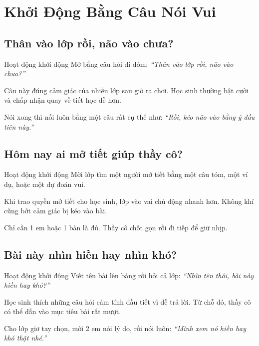\chapter{Khởi Động Bằng Câu Nói Vui}

\section{Thân vào lớp rồi, não vào chưa?}
\begin{khoidongbox}{Hoạt động khởi động}
Mở bằng câu hỏi dí dỏm: \textit{``Thân vào lớp rồi, não vào chưa?''}
\end{khoidongbox}
\begin{visaohieuqua}
Câu này đúng cảm giác của nhiều lớp sau giờ ra chơi. Học sinh thường bật cười và chấp nhận quay về tiết học dễ hơn.
\end{visaohieuqua}
\begin{cachlam5phut}
Nói xong thì nối luôn bằng một câu rất cụ thể như: \textit{``Rồi, kéo não vào bằng ý đầu tiên này.''}
\end{cachlam5phut}
\ngancach

\section{Hôm nay ai mở tiết giúp thầy cô?}
\begin{khoidongbox}{Hoạt động khởi động}
Mời lớp tìm một người mở tiết bằng một câu tóm, một ví dụ, hoặc một dự đoán vui.
\end{khoidongbox}
\begin{visaohieuqua}
Khi trao quyền mở tiết cho học sinh, lớp vào vai chủ động nhanh hơn. Không khí cũng bớt cảm giác bị kéo vào bài.
\end{visaohieuqua}
\begin{cachlam5phut}
Chỉ cần 1 em hoặc 1 bàn là đủ. Thầy cô chốt gọn rồi đi tiếp để giữ nhịp.
\end{cachlam5phut}
\ngancach

\section{Bài này nhìn hiền hay nhìn khó?}
\begin{khoidongbox}{Hoạt động khởi động}
Viết tên bài lên bảng rồi hỏi cả lớp: \textit{``Nhìn tên thôi, bài này hiền hay khó?''}
\end{khoidongbox}
\begin{visaohieuqua}
Học sinh thích những câu hỏi cảm tính đầu tiết vì dễ trả lời. Từ chỗ đó, thầy cô có thể dẫn vào mục tiêu bài rất mượt.
\end{visaohieuqua}
\begin{cachlam5phut}
Cho lớp giơ tay chọn, mời 2 em nói lý do, rồi nói luôn: \textit{``Mình xem nó hiền hay khó thật nhé.''}
\end{cachlam5phut}
\ngancach

